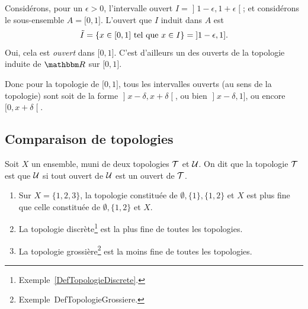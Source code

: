 \begin{example}  \label{ExKYZwYxn}
    Considérons, pour un \(\epsilon > 0 \), l'intervalle ouvert \( I = \mathopen]1 - \epsilon, 1 + \epsilon\mathclose[\); et considérons le sous-ensemble \(A = \mathopen[ 0 , 1 \mathclose]\). L'ouvert que \( I \) induit dans \( A \) est
    \begin{equation}
        \tilde I =\{ x\in\mathopen[ 0 , 1 \mathclose]\text{ tel que } x \in I \}=\mathopen] 1-\epsilon , 1 \mathclose].
    \end{equation}
    Oui, cela est \emph{ouvert} dans \( \mathopen[ 0 , 1 \mathclose]\). C'est d'ailleurs un des ouverts de la topologie induite de \( \eR\) sur \( \mathopen[ 0 , 1 \mathclose]\).

    Donc pour la topologie de \( \mathopen[ 0 , 1 \mathclose]\), tous les intervalles ouverts (au sens de la topologie) sont soit de la forme \( \mathopen]x - \delta, x + \delta \mathclose[\), ou bien \( \mathopen]x - \delta,1 \mathclose]\), ou encore \( \mathopen[0, x + \delta \mathclose[\).
\end{example}

\subsection{Comparaison de topologies}

\begin{definition}
  Soit \( X \) un ensemble, muni de deux topologies \( \mathcal{T} \) et \( \mathcal{U} \). On dit que la topologie \( \mathcal{T} \) est  que \( \mathcal{U} \) si tout ouvert de \( \mathcal{U} \) est un ouvert de \( \mathcal{T} \).
\end{definition}

\begin{example}
  \begin{enumerate}
  \item
    Sur \( X = \{ 1, 2, 3 \} \), la topologie constituée de \( \emptyset, \{1\}, \{1, 2 \}\) et \( X \) est plus fine que celle constituée de \( \emptyset, \{1, 2 \}\) et \( X \).
  \item
    La topologie discrète\footnote{Exemple~\ref{DefTopologieDiscrete}.} est la plus fine de toutes les topologies.
  \item
    La topologie grossière\footnote{Exemple~{DefTopologieGrossiere}.} est la moins fine de toutes les topologies.
  \end{enumerate}
\end{example}

